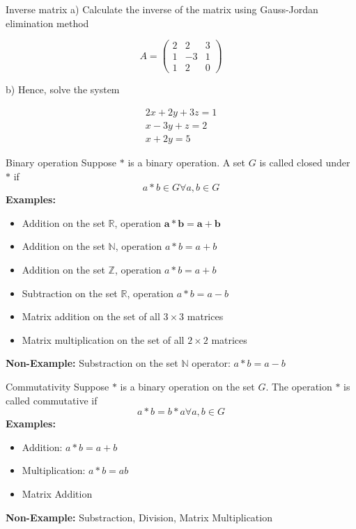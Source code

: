 \documentclass[11pt]{beamer}
\theoremstyle{plain}
\begin{document}
\begin{frame}{Inverse matrix}
a) Calculate the inverse of the matrix using Gauss-Jordan elimination method

$$
A=\left(\begin{array}{ccc}
2 & 2 & 3 \\
1 & -3 & 1 \\
1 & 2 & 0
\end{array}\right)
$$

b) Hence, solve the system

$$
\begin{array}{r}
2 x+2 y+3 z=1 \\
x-3 y+z=2 \\
x+2 y=5
\end{array}
$$
    
\end{frame}

\begin{frame}{Binary operation}
    Suppose $*$ is a binary operation. A set $G$ is called closed under $*$ if $$a*b\in G\forall a,b\in G$$
    \textbf{Examples:}
    \begin{itemize}
    \item Addition on the set $\mathbb{R}$, operation $\boldsymbol{a} * \boldsymbol{b}=\boldsymbol{a}+\boldsymbol{b}$
    \item Addition on the set $\mathbb{N}$, operation $a * b=a+b$
    \item Addition on the set $\mathbb{Z}$, operation $a * b=a+b$
    \item Subtraction on the set $\mathbb{R}$, operation $a * b=a-b$
    \item Matrix addition on the set of all $3 \times 3$ matrices
    \item Matrix multiplication on the set of all $2 \times 2$ matrices
    \end{itemize}
    \textbf{Non-Example:}
    Substraction on the set $\mathbb N$ operator: $a*b=a-b$
\end{frame}

\begin{frame}{Commutativity}
    Suppose $*$ is a binary operation on the set $G$. The operation $*$ is called commutative if $$a*b=b*a \forall a,b\in G$$
    \textbf{Examples:}
    \begin{itemize}
    \item Addition: $a*b=a+b$
    \item Multiplication: $a*b=ab$
    \item Matrix Addition
    \end{itemize}
    \textbf{Non-Example:}
    Substraction, Division, Matrix Multiplication
\end{frame}
\end{document}
